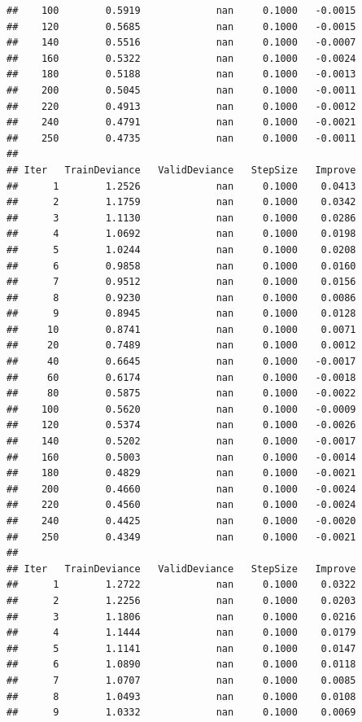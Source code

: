 \documentclass[
]{book}
\begin{document}
\begin{verbatim}
##    100        0.5919             nan     0.1000   -0.0015
##    120        0.5685             nan     0.1000   -0.0015
##    140        0.5516             nan     0.1000   -0.0007
##    160        0.5322             nan     0.1000   -0.0024
##    180        0.5188             nan     0.1000   -0.0013
##    200        0.5045             nan     0.1000   -0.0011
##    220        0.4913             nan     0.1000   -0.0012
##    240        0.4791             nan     0.1000   -0.0021
##    250        0.4735             nan     0.1000   -0.0011
## 
## Iter   TrainDeviance   ValidDeviance   StepSize   Improve
##      1        1.2526             nan     0.1000    0.0413
##      2        1.1759             nan     0.1000    0.0342
##      3        1.1130             nan     0.1000    0.0286
##      4        1.0692             nan     0.1000    0.0198
##      5        1.0244             nan     0.1000    0.0208
##      6        0.9858             nan     0.1000    0.0160
##      7        0.9512             nan     0.1000    0.0156
##      8        0.9230             nan     0.1000    0.0086
##      9        0.8945             nan     0.1000    0.0128
##     10        0.8741             nan     0.1000    0.0071
##     20        0.7489             nan     0.1000    0.0012
##     40        0.6645             nan     0.1000   -0.0017
##     60        0.6174             nan     0.1000   -0.0018
##     80        0.5875             nan     0.1000   -0.0022
##    100        0.5620             nan     0.1000   -0.0009
##    120        0.5374             nan     0.1000   -0.0026
##    140        0.5202             nan     0.1000   -0.0017
##    160        0.5003             nan     0.1000   -0.0014
##    180        0.4829             nan     0.1000   -0.0021
##    200        0.4660             nan     0.1000   -0.0024
##    220        0.4560             nan     0.1000   -0.0024
##    240        0.4425             nan     0.1000   -0.0020
##    250        0.4349             nan     0.1000   -0.0021
## 
## Iter   TrainDeviance   ValidDeviance   StepSize   Improve
##      1        1.2722             nan     0.1000    0.0322
##      2        1.2256             nan     0.1000    0.0203
##      3        1.1806             nan     0.1000    0.0216
##      4        1.1444             nan     0.1000    0.0179
##      5        1.1141             nan     0.1000    0.0147
##      6        1.0890             nan     0.1000    0.0118
##      7        1.0707             nan     0.1000    0.0085
##      8        1.0493             nan     0.1000    0.0108
##      9        1.0332             nan     0.1000    0.0069

\end{verbatim}
\end{document}
